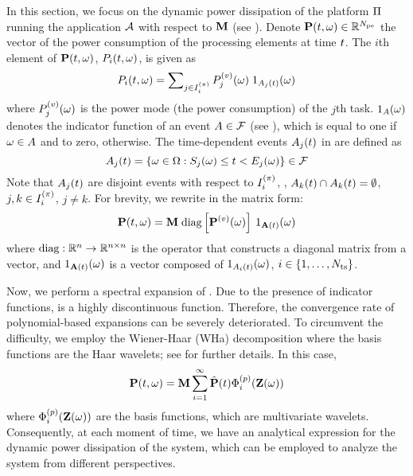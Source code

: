 In this section, we focus on the dynamic power dissipation of the platform $\Pi$ running the application $\mathcal{A}$ with respect to $\mathbf{M}$ (see ). Denote $\mathbf{P}(t, \omega) \in \mathbb{R}^{N_\text{pe}}$ the vector of the power consumption of the processing elements at time $t$. The $i$th element of $\mathbf{P}(t, \omega)$, $P_i(t, \omega)$, is given as
\begin{equation} \elabel{processor-power}
  \PP_i(\t, \o) = \sum\nolimits_{j \in \iProcessor_i} \PT_j(\o) \; \I_{\event_j(\t)}(\o)
\end{equation}
where $P^{(v)}_j(\omega)$ is the power mode (the power consumption) of the $j$th task. $1_A(\omega)$ denotes the indicator function of an event $A \in \mathcal{F}$ (see ), which is equal to one if $\omega \in A$ and to zero, otherwise. The time-dependent events $A_j(t)$ in  are defined as
\[
  A_j(t) = \{ \omega \in \Omega: S_j(\omega) \leq t < E_j(\omega) \} \in \mathcal{F}
\]
Note that $A_j(t)$ are disjoint events with respect to $I^{(\pi)}_i$, \ie, $A_k(t) \cap A_k(t) = \emptyset$, $j, k \in I^{(\pi)}_i$, $j \neq k$. For brevity, we rewrite  in the matrix form:
\begin{equation} \elabel{platform-power}
  \vPP(\t, \o) = \mM \; \oDiag{\vPT(\o)} \: \I_{\m{\event}(\t)}(\o)
\end{equation}
where $\oDiag: \real^n \to \real^{n \times n}$ is the operator that constructs a diagonal matrix from a vector, and $1_{\mathbf{A}(t)}(\omega)$ is a vector composed of $1_{A_i(t)}(\omega)$, $i \in \{ 1, \dots, {N_\text{ts}} \}$.

Now, we perform a spectral expansion of . Due to the presence of indicator functions,  is a highly discontinuous function. Therefore, the convergence rate of polynomial-based expansions can be severely deteriorated. To circumvent the difficulty, we employ the Wiener-Haar (WHa) decomposition \cite{maitre2004} where the basis functions are the Haar wavelets; see  for further details. In this case,
\[
  \mathbf{P}(t, \omega) = \mathbf{M} \sum_{i = 1}^\infty \hat{\mathbf{P}}(t) \Phi^{(p)}_i(\mathbf{Z}(\omega))
\]
where $\Phi^{(p)}_i(\mathbf{Z}(\omega))$ are the basis functions, which are multivariate wavelets. Consequently, at each moment of time, we have an analytical expression for the dynamic power dissipation of the system, which can be employed to analyze the system from different perspectives.
